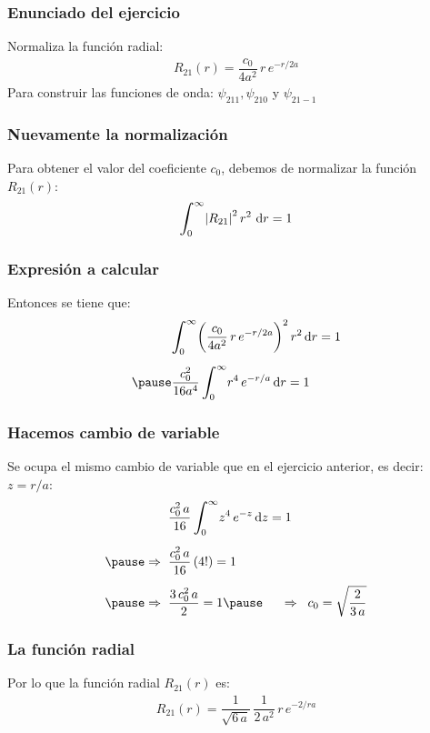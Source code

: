 \documentclass[12pt]{beamer}
\begin{document}
\begin{frame}
\frametitle{Enunciado del ejercicio}
Normaliza la función radial:
\begin{align*}
R_{21} (r) = \dfrac{c_{0}}{4 a^{2}} \, r \, e^{-r/2a}
\end{align*}
\pause
Para construir las funciones de onda: $\psi_{211}, \psi_{210}$ y $\psi_{21-1}$
\end{frame}
\begin{frame}
\frametitle{Nuevamente la normalización}
Para obtener el valor del coeficiente $c_{0}$, debemos de normalizar la función $R_{21} (r)$:
\pause
\begin{align*}
\scaleint{6ex}_{\bs 0}^{\infty} \abs{R_{21}}^{2} \, r^{2} \, \dd{r} = 1
\end{align*}
\end{frame}
\begin{frame}
\frametitle{Expresión a calcular}
Entonces se tiene que:
\pause
\begin{eqnarray*}
\begin{aligned}
&\scaleint{6ex}_{\bs 0}^{\infty} \bigg( \dfrac{c_{0}}{4 a^{2}} \, r \, e^{-r/2a} \bigg)^{2} \, r^{2} \dd{r} = 1 \\[0.5em] \pause
&\dfrac{c_{0}^{2}}{16 a^{4}} \, \scaleint{6ex}_{\bs 0}^{\infty}  r^{4} \, e^{-r/a} \dd{r} = 1
\end{aligned}
\end{eqnarray*}
\end{frame}
\begin{frame}
\frametitle{Hacemos cambio de variable}
Se ocupa el mismo cambio de variable que en el ejercicio anterior, es decir: $z = r/a$:
\pause
\begin{eqnarray*}
\begin{aligned}
&\dfrac{c_{0}^{2} \, a}{16} \, \scaleint{6ex}_{\bs 0}^{\infty}  z^{4} \, e^{-z} \dd{z} = 1 \\[0.5em] \pause
\Rightarrow \hspace{0.2cm} &\dfrac{c_{0}^{2} \, a}{16} \, (4!) = 1 \\[0.5em] \pause
\Rightarrow \hspace{0.2cm} &\dfrac{3 \, c_{0}^{2} \, a}{2} = 1 \pause \hspace{0.5cm} \Rightarrow \hspace{0.2cm} c_{0} = \sqrt{\dfrac{2}{3 \, a}}
\end{aligned}
\end{eqnarray*}
\end{frame}
\begin{frame}
\frametitle{La función radial}
Por lo que la función radial $R_{21} (r)$ es:
\pause
\begin{align*}
R_{21} (r) = \dfrac{1}{\sqrt{6 \, a}} \, \dfrac{1}{2 \, a^{2}} \, r \, e^{-2/ra}
\end{align*}
\end{frame}
\end{document}
